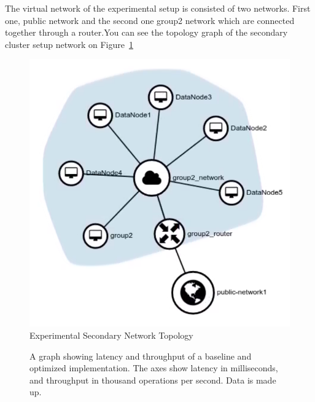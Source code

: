 The virtual network of the experimental setup is consisted of two networks. First one, public network and the second one group2 network which are connected together through a router.You can see the topology graph of the secondary cluster setup network on Figure~\ref{fig:topology}

\begin{figure}[t]
   \centering
   \includegraphics[width=\linewidth]{fig/NetworkTopology.png}
    \caption{Experimental Secondary Network Topology}
    \label{fig:topology}
\end{figure}


\begin{figure}
\caption{A graph showing latency and throughput of a baseline and optimized implementation. The axes show latency in milliseconds, and throughput in thousand operations per second. Data is made up.}
\label{fig:graph}
\end{figure}
